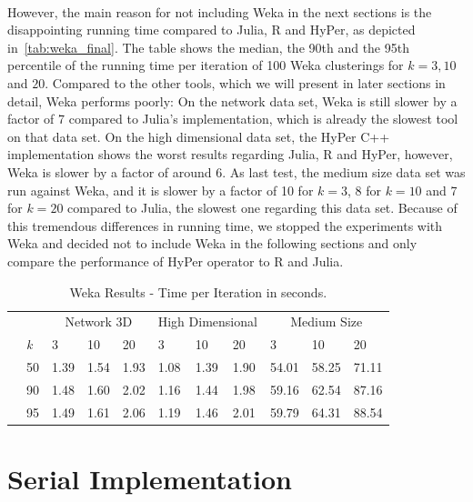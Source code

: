 \\
However, the main reason for not including Weka in the next sections is the disappointing running time compared to Julia, R and HyPer, as depicted in~\autoref{tab:weka_final}. The table shows the median, the 90th and the 95th percentile of the running time per iteration of 100 Weka clusterings for $k = 3, 10$ and $20$. Compared to the other tools, which we will present in later sections in detail, Weka performs poorly: On the network data set, Weka is still slower by a factor of 7 compared to Julia's implementation, which is already the slowest tool on that data set. On the high dimensional data set, the HyPer C++ implementation shows the worst results regarding Julia, R and HyPer, however, Weka is slower by a factor of around 6. As last test, the medium size data set was run against Weka, and it is slower by a factor of 10 for $k = 3$, 8 for $k = 10$ and 7 for $k = 20$ compared to Julia, the slowest one regarding this data set. Because of this tremendous differences in running time, we stopped the experiments with Weka and decided not to include Weka in the following sections and only compare the performance of HyPer operator to R and Julia.

\begin{table}[htsb]
  \caption[Weka Results - Time per Iteration]{Weka Results - Time per Iteration in seconds.}
  \label{tab:weka_final}
  \centering
  \begin{tabular}{ll l l l |l l l |l l l }
    \toprule
      &  & \multicolumn{3}{c}{Network 3D} & \multicolumn{3}{c}{High Dimensional} & \multicolumn{3}{c}{Medium Size}  \\
      & \emph{k} & 3 & 10 & 20 & 3 & 10 & 20 & 3 & 10 & 20 \\
    \midrule
      \parbox[t]{2mm}{} & 50  & 1.39 & 1.54 & 1.93 & 1.08 & 1.39 & 1.90 & 54.01 & 58.25 & 71.11 \\
      & 90  & 1.48 & 1.60 & 2.02 & 1.16 & 1.44 & 1.98 &59.16 & 62.54 & 87.16 \\
      & 95  & 1.49 & 1.61 & 2.06 & 1.19 & 1.46 & 2.01 & 59.79 & 64.31 & 88.54 \\
    \bottomrule
  \end{tabular}
\end{table}



\section{Serial Implementation}\label{section:serial}


